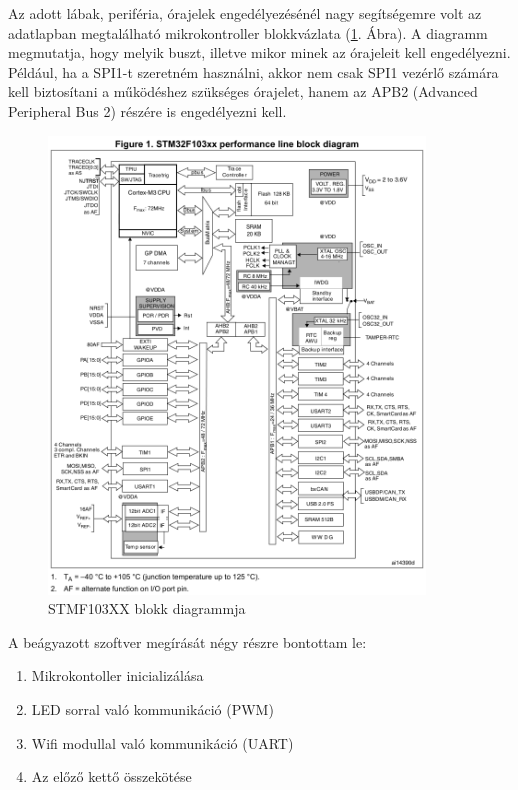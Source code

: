 \documentclass[../main.tex]{subfiles}
\begin{document}
        Az adott lábak, periféria, órajelek engedélyezésénél nagy segítségemre volt az adatlapban megtalálható mikrokontroller blokkvázlata (\ref{fig:stm32f103xx_block_diagram}. Ábra). A diagramm megmutatja, hogy melyik buszt, illetve mikor minek az órajeleit kell engedélyezni. Például, ha a SPI1-t szeretném használni, akkor nem csak SPI1 vezérlő számára kell biztosítani a működéshez szükséges órajelet, hanem az APB2 (Advanced Peripheral Bus 2) részére is engedélyezni kell.
        \begin{figure}[h!]
            \centering
                \includegraphics[width=10cm]{resources/mbed_res/stm32f103xx_block_diagram.png}
                \caption{STMF103XX blokk diagrammja}
                \label{fig:stm32f103xx_block_diagram}
        \end{figure}
        
        A beágyazott szoftver megírását négy részre bontottam le:
        \begin{enumerate}
            \item Mikrokontoller inicializálása
            \item LED sorral való kommunikáció (PWM)
            \item Wifi modullal való kommunikáció (UART)
            \item Az előző kettő összekötése
        \end{enumerate}
        
\end{document}
